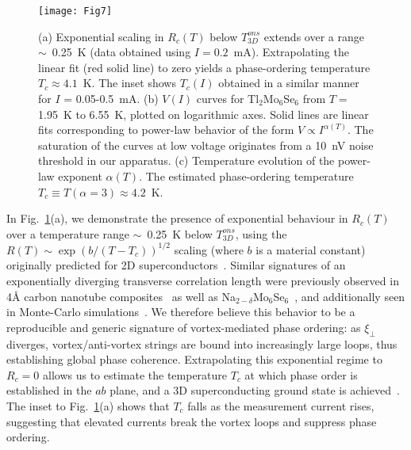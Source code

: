 \documentclass[prb,twocolumn,showpacs,preprintnumbers,amsmath,amssymb,floatfix,groupedaddress,superscriptaddress,aps,10pt]{revtex4-1}
\newcommand{\Na}{Na$_{2-\delta}$Mo$_6$Se$_6$}
\begin{document}
{\begin{figure}[htbp]
	\centering 
	\texttt{[image: Fig7]}
	\caption{\label{Fig7} (a) Exponential scaling in $R_c(T)$ below $T_{3D}^{ons}$ extends over a range $\sim$~0.25~K (data obtained using $I=0.2$~mA). Extrapolating the linear fit (red solid line) to zero yields a phase-ordering temperature $T_c\approx4.1$~K. The inset shows $T_c(I)$ obtained in a similar manner for $I$ = 0.05-0.5~mA.  (b) $V(I)$ curves for Tl$_2$Mo$_6$Se$_6$ from $T=$ 1.95~K to 6.55~K, plotted on logarithmic axes.  Solid lines are linear fits corresponding to power-law behavior of the form $V$$\propto$$I^{\alpha(T)}$. The saturation of the curves at low voltage originates from a 10~nV noise threshold in our apparatus.  (c) Temperature evolution of the power-law exponent $\alpha(T)$. The estimated phase-ordering temperature $T_c \equiv T(\alpha=3)\approx4.2$~K.}
\end{figure}

In Fig.~\ref{Fig7}(a), we demonstrate the presence of exponential behaviour in $R_c(T)$ over a temperature range $\sim$~0.25~K below $T_{3D}^{ons}$, using the $R(T)\sim\exp{(b/(T-T_c))^{1/2}}$ scaling (where $b$ is a material constant) originally predicted for 2D superconductors~\cite{Halperin1979}. Similar signatures of an exponentially diverging transverse correlation length were previously observed in 4{\AA} carbon nanotube composites~\cite{Wang2010} as well as {\Na}~\cite{Ansermet2016}, and additionally seen in Monte-Carlo simulations~\cite{Sun2012}. We therefore believe this behavior to be a reproducible and generic signature of vortex-mediated phase ordering: as $\xi_\perp$ diverges, vortex/anti-vortex strings are bound into increasingly large loops, thus establishing global phase coherence.  Extrapolating this exponential regime to $R_c=0$ allows us to estimate the temperature $T_c$ at which phase order is established in the $ab$ plane, and a 3D superconducting ground state is achieved~\cite{Schneider2009}.  The inset to Fig.~\ref{Fig7}(a) shows that $T_c$ falls as the measurement current rises, suggesting that elevated currents break the vortex loops and suppress phase ordering.  

}
\end{document}
